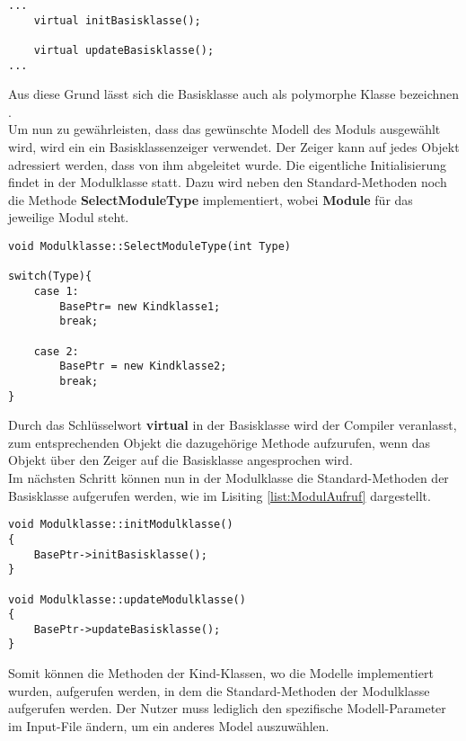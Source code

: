 \begin{lstlisting}[label = {list:Basisklasse}, caption = Aufbau des Header-Files der Basisklasse,captionpos=b]
...
	virtual initBasisklasse();

	virtual updateBasisklasse();
...
\end{lstlisting}
Aus diese Grund lässt sich die Basisklasse auch als polymorphe Klasse bezeichnen \cite{Wolf.2014}. \\
Um nun zu gewährleisten, dass das gewünschte Modell des Moduls ausgewählt wird, wird ein ein Basisklassenzeiger verwendet. Der Zeiger kann auf jedes Objekt adressiert werden, dass von ihm abgeleitet wurde. Die eigentliche Initialisierung findet in der Modulklasse statt. Dazu wird neben den Standard-Methoden noch die Methode \textbf{SelectModuleType} implementiert, wobei \textbf{Module} für das jeweilige Modul steht. \newpage
\begin{lstlisting}[label = {list:ModulAuswahl}, caption = Basisklassenzeiger im Modul.cpp File ,captionpos=b]
void Modulklasse::SelectModuleType(int Type)

switch(Type){
	case 1:
		BasePtr= new Kindklasse1;
		break;
	
	case 2: 
		BasePtr = new Kindklasse2;
		break;
}

\end{lstlisting}
Durch das Schlüsselwort \textbf{virtual} in der Basisklasse wird der Compiler veranlasst, zum entsprechenden Objekt die dazugehörige Methode aufzurufen, wenn das Objekt über den Zeiger auf die Basisklasse angesprochen wird. \\
Im nächsten Schritt können nun in der Modulklasse die Standard-Methoden der Basisklasse aufgerufen werden, wie im Lisiting \ref{list:ModulAufruf} dargestellt.
\begin{lstlisting}[label = {list:ModulAufruf}, caption = Aufruf der Standard-Methoden  im Modul.cpp File ,captionpos=b]
void Modulklasse::initModulklasse()
{
	BasePtr->initBasisklasse();
}

void Modulklasse::updateModulklasse()
{
	BasePtr->updateBasisklasse();
}
\end{lstlisting}

Somit können die Methoden der Kind-Klassen, wo die Modelle implementiert wurden, aufgerufen werden, in dem die Standard-Methoden der Modulklasse aufgerufen werden. Der Nutzer muss lediglich den spezifische Modell-Parameter im Input-File ändern, um ein anderes Model auszuwählen.
\newpage
